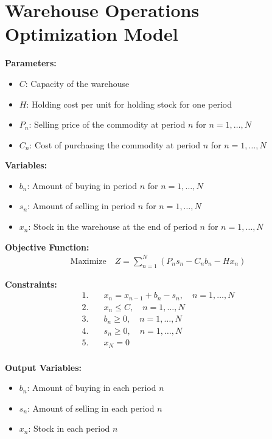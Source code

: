 \documentclass{article}
\begin{document}
\section*{Warehouse Operations Optimization Model}

\textbf{Parameters:}
\begin{itemize}
    \item $C$: Capacity of the warehouse
    \item $H$: Holding cost per unit for holding stock for one period
    \item $P_n$: Selling price of the commodity at period $n$ for $n = 1, \ldots, N$
    \item $C_n$: Cost of purchasing the commodity at period $n$ for $n = 1, \ldots, N$
\end{itemize}

\textbf{Variables:}
\begin{itemize}
    \item $b_n$: Amount of buying in period $n$ for $n = 1, \ldots, N$
    \item $s_n$: Amount of selling in period $n$ for $n = 1, \ldots, N$
    \item $x_n$: Stock in the warehouse at the end of period $n$ for $n = 1, \ldots, N$
\end{itemize}

\textbf{Objective Function:}
\begin{align*}
    \text{Maximize} \quad Z = \sum_{n=1}^{N} (P_n s_n - C_n b_n - H x_n)
\end{align*}

\textbf{Constraints:}
\begin{align*}
    1. & \quad x_n = x_{n-1} + b_n - s_n, \quad n = 1, \ldots, N \\
    2. & \quad x_n \leq C, \quad n = 1, \ldots, N \\
    3. & \quad b_n \geq 0, \quad n = 1, \ldots, N \\
    4. & \quad s_n \geq 0, \quad n = 1, \ldots, N \\
    5. & \quad x_N = 0 \\
\end{align*}

\textbf{Output Variables:}
\begin{itemize}
    \item $b_n$: Amount of buying in each period $n$
    \item $s_n$: Amount of selling in each period $n$
    \item $x_n$: Stock in each period $n$
\end{itemize}
\end{document}
